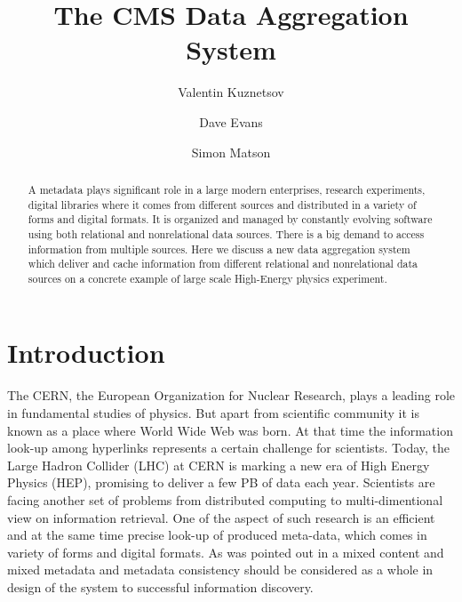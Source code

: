 \documentclass[a4paper]{jpconf}
\begin{document}
\title{The CMS Data Aggregation System}

\author{Valentin Kuznetsov}
\address{Cornell University, Ithaca, New York, USA}

\author{Dave Evans}
\address{Fermilab, Batavia, Illinois, USA}

\author{Simon Matson}
\address{Bristol University, Bristol, UK}



\begin{abstract}
A metadata plays significant role in a large modern enterprises, research experiments,
digital libraries where it comes from different sources and distributed in a 
variety of forms and digital formats. It is organized and managed by constantly
evolving software using both relational and nonrelational data sources. There is
a big demand to access information from multiple sources.
Here we discuss a new data aggregation system which deliver and cache information 
from different relational and nonrelational data sources on a concrete example 
of large scale High-Energy physics experiment.
\end{abstract}

\newpage

\section{Introduction}
The CERN, the European Organization for Nuclear Research, plays a leading
role in fundamental studies of physics. But apart from scientific community 
it is known as a place where World Wide Web was born. At that time the 
information look-up among hyperlinks represents a certain challenge for scientists.
Today, the Large Hadron Collider (LHC) at CERN is marking a new era of High Energy
Physics (HEP), promising to deliver a few PB of data each year. Scientists are
facing another set of problems from distributed computing to multi-dimentional
view on information retrieval. One of the aspect of such research is an efficient
and at the same time precise look-up of produced meta-data, which comes in variety 
of forms and digital formats. As was pointed out in \cite{Amr} a mixed content and 
mixed metadata and metadata consistency should be considered as a whole in design 
of the system to successful information discovery. 
\end{document}
